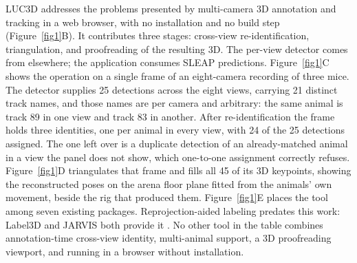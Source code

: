 \documentclass[pdflatex, sn-nature]{sn-jnl}
\theoremstyle{thmstyleone}%
\theoremstyle{thmstyletwo}%
\theoremstyle{thmstylethree}%
\begin{document}
LUC3D addresses the problems presented by multi-camera 3D annotation and tracking in a web browser, with no installation and no build step (Figure~\ref{fig1}B). It contributes three stages: cross-view re-identification, triangulation, and proofreading of the resulting 3D. The per-view detector comes from elsewhere; the application consumes SLEAP predictions. Figure~\ref{fig1}C shows the operation on a single frame of an eight-camera recording of three mice. The detector supplies 25 detections across the eight views, carrying 21 distinct track names, and those names are per camera and arbitrary: the same animal is track 89 in one view and track 83 in another. After re-identification the frame holds three identities, one per animal in every view, with 24 of the 25 detections assigned. The one left over is a duplicate detection of an already-matched animal in a view the panel does not show, which one-to-one assignment correctly refuses. Figure~\ref{fig1}D triangulates that frame and fills all 45 of its 3D keypoints, showing the reconstructed poses on the arena floor plane fitted from the animals' own movement, beside the rig that produced them. Figure~\ref{fig1}E places the tool among seven existing packages. Reprojection-aided labeling predates this work: Label3D and JARVIS both provide it \citep{Hueser2023, Aldarondo2019}. No other tool in the table combines annotation-time cross-view identity, multi-animal support, a 3D proofreading viewport, and running in a browser without installation.
\end{document}
